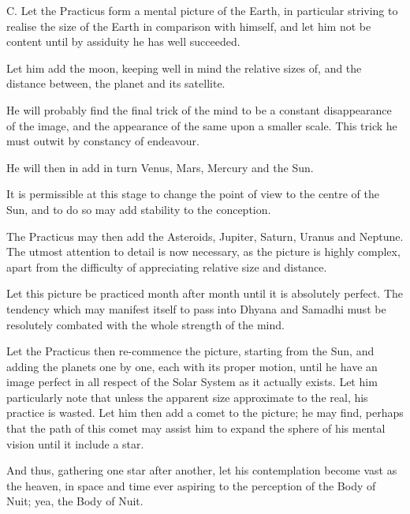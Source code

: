 \begin{quoting}

C. Let the Practicus form a mental picture of the Earth, in particular striving to realise the size of the Earth in comparison with himself, and let him not be content until by assiduity he has well succeeded.

Let him add the moon, keeping well in mind the relative sizes of, and the distance between, the planet and its satellite.

He will probably find the final trick of the mind to be a constant disappearance of the image, and the appearance of the same upon a smaller scale. This trick he must outwit by constancy of endeavour.

He will then in add in turn Venus, Mars, Mercury and the Sun.

It is permissible at this stage to change the point of view to the centre of the Sun, and to do so may add stability to the conception.

The Practicus may then add the Asteroids, Jupiter, Saturn, Uranus and Neptune. The utmost attention to detail is now necessary, as the picture is highly complex, apart from the difficulty of appreciating relative size and distance.

Let this picture be practiced month after month until it is absolutely perfect. The tendency which may manifest itself to pass into Dhyana and Samadhi must be resolutely combated with the whole strength of the mind.

Let the Practicus then re-commence the picture, starting from the Sun, and adding the planets one by one, each with its proper motion, until he have an image perfect in all respect of the Solar System as it actually exists. Let him particularly note that unless the apparent size approximate to the real, his practice is wasted. Let him then add a comet to the picture; he may find, perhaps that the path of this comet may assist him to expand the sphere of his mental vision until it include a star.

And thus, gathering one star after another, let his contemplation become vast as the heaven, in space and time ever aspiring to the perception of the Body of Nuit; yea, the Body of Nuit.
\end{quoting}

